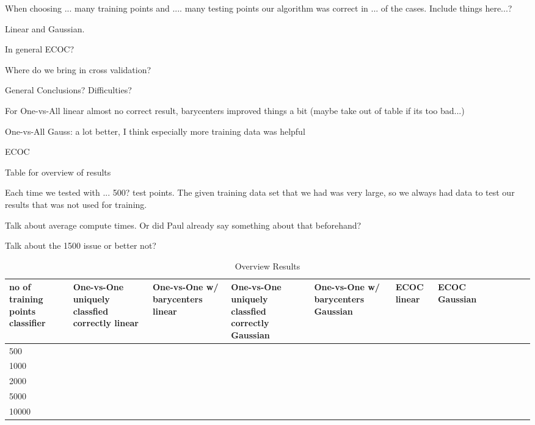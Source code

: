 When choosing ... many training points and .... many testing points our algorithm was correct in ... of the cases. Include things here...?


Linear and Gaussian.

In general ECOC?

Where do we bring in cross validation?

General Conclusions? Difficulties?

For One-vs-All linear almost no correct result, barycenters improved things a bit (maybe take out of table if its too bad...)

One-vs-All Gauss: a lot better, I think especially more training data was helpful

ECOC 

Table for overview of results 

Each time we tested with ... 500? test points. The given training data set that we had was very large, so we always had data to test our results that was not used for training. 

Talk about average compute times. Or did Paul already say something about that beforehand? 

Talk about the 1500 issue or better not?


\begin{table}[ht!]
	\centering
	\caption{Overview Results}
	\begin{tabular}{|l|l|l|l|l|l|l|l|l|l|l|l|} \hline
\multicolumn{1}{|p{2cm}|}{no of training points classifier} & \multicolumn{1}{p{2cm}|}{One-vs-One uniquely classfied correctly linear} & \multicolumn{1}{p{2cm}|}{One-vs-One w/ barycenters linear} & \multicolumn{1}{p{2cm}|}{One-vs-One uniquely classfied correctly Gaussian} &  \multicolumn{1}{p{2cm}|}{One-vs-One w/ barycenters Gaussian} & \multicolumn{1}{p{2cm}|}{ECOC linear} & \multicolumn{1}{p{2cm}|}{ECOC Gaussian} \\ \hline \hline
	500	&  &  &  &  &  &  \\ \hline
	1000	&  &  &  &  &  &  \\ \hline
	2000	&  &  &  &  &  &  \\ \hline
	5000	&  &  &  &  &  &  \\ \hline
	10000	&  &  &  &  &  &  \\ \hline
	\end{tabular}
\end{table}

